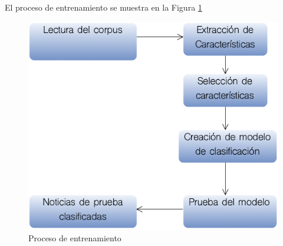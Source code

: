 El proceso de entrenamiento se muestra en la Figura \ref{fig:clasificacion}

\begin{figure}[ht]
\centering
\includegraphics[scale=0.35]{imagenes/Resultados/Clasificacion.png}
\caption{Proceso de entrenamiento}
\label{fig:clasificacion}
\end{figure}

